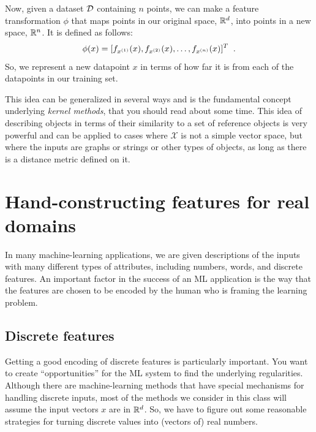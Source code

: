 
Now, given a dataset ${\cal D}$ containing $n$ points, we can make a
feature transformation $\phi$ that maps points in our original
space, $\mathbb{R}^d$, into points in a new space, $\mathbb{R}^n$.  It is defined as
follows:
\[\phi(x) = [f_{x^{(1)}}(x), f_{x^{(2)}}(x), \ldots,
  f_{x^{(n)}}(x)]^T\;\;.\]
So, we represent a new datapoint $x$ in terms of how far it is from
each of the datapoints in our training set.

This idea can be generalized in several ways and is the fundamental
concept underlying {\em kernel methods}, that
you should read about some time. This idea of describing objects in
terms of their similarity to a set of reference objects is very
powerful and can be applied to cases where $\mathcal{X}$ is not a
simple vector space, but where the inputs are graphs or strings or
other types of objects, as long as there is a distance metric defined
on it.


\section{Hand-constructing features for real domains}

\label{handBuiltFeatures}
In many machine-learning applications, we are given descriptions of
the inputs with many different types of attributes, including numbers,
words, and discrete features.  An important factor in the success of
an ML application is the way that the features are chosen to be encoded
by the human who is framing the learning problem.

\subsection{Discrete features}
Getting a good encoding of discrete features is particularly
important.  You want to create ``opportunities'' for the ML system to
find the underlying regularities.  Although there are machine-learning
methods that have special mechanisms for handling discrete inputs,
most of
the methods we consider in this class will assume the input vectors
$x$ are in $\mathbb{R}^d$.  So, we have to figure out some reasonable
strategies for turning discrete values into (vectors of) real numbers.

